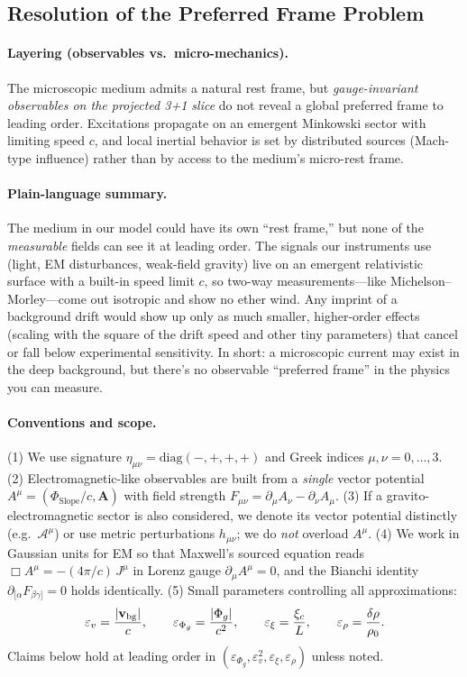 \subsection{Resolution of the Preferred Frame Problem}
\label{subsec:preferred-frame}

\paragraph*{Layering (observables vs.\ micro-mechanics).}
The microscopic medium admits a natural rest frame, but \emph{gauge-invariant observables on the projected 3+1 slice} do not reveal a global preferred frame to leading order. Excitations propagate on an emergent Minkowski sector with limiting speed $c$, and local inertial behavior is set by distributed sources (Mach-type influence) rather than by access to the medium's micro-rest frame.

\paragraph*{Plain-language summary.} The medium in our model could have its own “rest frame,” but none of the \emph{measurable} fields can see it at leading order. The signals our instruments use (light, EM disturbances, weak-field gravity) live on an emergent relativistic surface with a built-in speed limit $c$, so two-way measurements—like Michelson–Morley—come out isotropic and show no ether wind. Any imprint of a background drift would show up only as much smaller, higher-order effects (scaling with the square of the drift speed and other tiny parameters) that cancel or fall below experimental sensitivity. In short: a microscopic current may exist in the deep background, but there's no observable “preferred frame” in the physics you can measure.

\paragraph{Conventions and scope.}
(1) We use signature $\eta_{\mu\nu}=\mathrm{diag}(-,+,+,+)$ and Greek indices $\mu,\nu=0,\dots,3$. 
(2) Electromagnetic-like observables are built from a \emph{single} vector potential $A^\mu=(\Phi_{\text{Slope}}/c,\mathbf A)$ with field strength $F_{\mu\nu}=\partial_\mu A_\nu-\partial_\nu A_\mu$. 
(3) If a gravito-electromagnetic sector is also considered, we denote its vector potential distinctly (e.g.\ $\mathcal A^\mu$) or use metric perturbations $h_{\mu\nu}$; we do \emph{not} overload $A^\mu$.
(4) We work in Gaussian units for EM so that Maxwell's sourced equation reads $\Box A^\mu=-(4\pi/c)\,J^\mu$ in Lorenz gauge $\partial_\mu A^\mu=0$, and the Bianchi identity $\partial_{[\alpha}F_{\beta\gamma]}=0$ holds identically.
(5) Small parameters controlling all approximations:
\begin{equation}
\varepsilon_v=\frac{|\mathbf v_{\rm bg}|}{c},\qquad
\varepsilon_{\Phi_g}=\frac{|\Phi_g|}{c^2},\qquad
\varepsilon_\xi=\frac{\xi_c}{L},\qquad
\varepsilon_\rho=\frac{\delta\rho}{\rho_0}.
\end{equation}
Claims below hold at leading order in $(\varepsilon_{\Phi_g},\varepsilon_v^2,\varepsilon_\xi,\varepsilon_\rho)$ unless noted.

